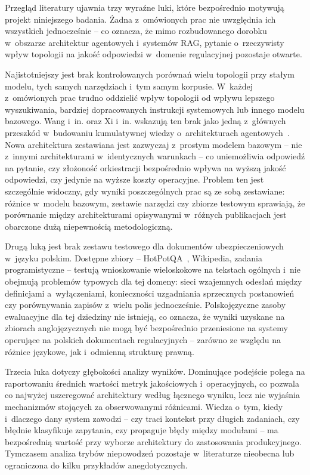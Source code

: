 Przegląd literatury ujawnia trzy wyraźne luki, które bezpośrednio motywują
projekt niniejszego badania. Żadna z~omówionych prac nie uwzględnia ich
wszystkich jednocześnie -- co oznacza, że mimo rozbudowanego dorobku w~obszarze
architektur agentowych i~systemów RAG, pytanie o~rzeczywisty wpływ topologii na
jakość odpowiedzi w~domenie regulacyjnej pozostaje otwarte.

Najistotniejszy jest brak kontrolowanych porównań wielu topologii przy stałym
modelu, tych samych narzędziach i~tym samym korpusie. W~każdej z~omówionych
prac trudno oddzielić wpływ topologii od wpływu lepszego wyszukiwania, bardziej
dopracowanych instrukcji systemowych lub innego modelu bazowego. Wang i~in.
oraz Xi i~in. wskazują ten brak jako jedną z~głównych przeszkód w~budowaniu
kumulatywnej wiedzy o~architekturach agentowych~\cite{wang2024survey,
  xi2025rise}. Nowa architektura zestawiana jest zazwyczaj z~prostym modelem
bazowym -- nie z~innymi architekturami w~identycznych warunkach -- co
uniemożliwia odpowiedź na pytanie, czy złożoność orkiestracji bezpośrednio
wpływa na wyższą jakość odpowiedzi, czy jedynie na wyższe koszty operacyjne.
Problem ten jest szczególnie widoczny, gdy wyniki poszczególnych prac są ze
sobą zestawiane: różnice w~modelu bazowym, zestawie narzędzi czy zbiorze
testowym sprawiają, że porównanie między architekturami opisywanymi w~różnych
publikacjach jest obarczone dużą niepewnością metodologiczną.

Drugą luką jest brak zestawu testowego dla dokumentów ubezpieczeniowych
w~języku polskim. Dostępne zbiory -- HotPotQA~\cite{yang2018hotpotqa},
Wikipedia, zadania programistyczne -- testują wnioskowanie wieloskokowe na
tekstach ogólnych i~nie obejmują problemów typowych dla tej domeny: sieci
wzajemnych odesłań między definicjami a~wyłączeniami, konieczności uzgadniania
sprzecznych postanowień czy porównywania zapisów z~wielu polis jednocześnie.
Polskojęzyczne zasoby ewaluacyjne dla tej dziedziny nie istnieją, co oznacza,
że wyniki uzyskane na zbiorach anglojęzycznych nie mogą być bezpośrednio
przeniesione na systemy operujące na polskich dokumentach regulacyjnych --
zarówno ze względu na różnice językowe, jak i~odmienną strukturę prawną.

Trzecia luka dotyczy głębokości analizy wyników. Dominujące podejście polega na
raportowaniu średnich wartości metryk jakościowych i~operacyjnych, co pozwala
co najwyżej uszeregować architektury według łącznego wyniku, lecz nie wyjaśnia
mechanizmów stojących za obserwowanymi różnicami. Wiedza o~tym, kiedy
i~dlaczego dany system zawodzi -- czy traci kontekst przy długich zadaniach,
czy błędnie klasyfikuje zapytania, czy propaguje błędy między modułami -- ma
bezpośrednią wartość przy wyborze architektury do zastosowania produkcyjnego.
Tymczasem analiza trybów niepowodzeń pozostaje w~literaturze nieobecna lub
ograniczona do kilku przykładów anegdotycznych.


